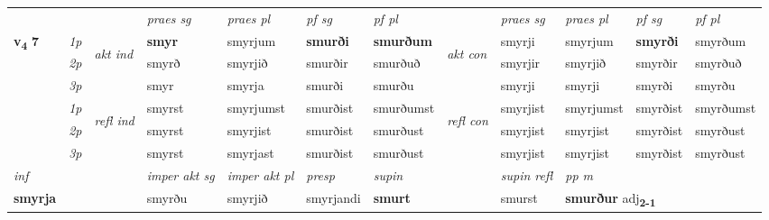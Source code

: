 \begin{longtable}[l]{X>{\footnotesize\itshape}llXXXXlXXXX}
 & &   & \textit{praes sg}  & \textit{praes pl}    & \textit{ pf sg} & \textit{pf pl} & & \textit{praes sg}  & \textit{praes pl}    & \textit{pf sg} & \textit{pf pl }  \\ \cmidrule{4-7} \cmidrule{9-12}
 \multirow{2}{*}{{{\textbf{v{\textsubscript{4}}} \Large{\textbf{7}}}}}  & 1p & \multirow{3}{*}{\begin{turn}{90}\textit{akt ind}\end{turn}} & \textbf{smyr} & smyrjum & \textbf{smurði} & \textbf{smurðum} & \multirow{3}{*}{\begin{turn}{90}\textit{akt con}\end{turn}} &smyrji & smyrjum & \textbf{smyrði} & smyrðum\\*
 & 2p &  &  smyrð  & smyrjið & smurðir & smurðuð & & smyrjir & smyrjið & smyrðir & smyrðuð \\*
 & 3p &  & smyr & smyrja & smurði & smurðu & & smyrji & smyrji& smyrði & smyrðu \\*
\cmidrule{4-7} \cmidrule{9-12}
 & 1p & \multirow{3}{*}{\begin{turn}{90}\textit{refl ind}\end{turn}}  & smyrst & smyrjumst & smurðist & smurðumst & \multirow{3}{*}{\begin{turn}{90}\textit{refl con}\end{turn}}  &smyrjist & smyrjumst & smyrðist & smyrðumst \\*
 & 2p &  & smyrst & smyrjist & smurðist & smurðust & &smyrjist & smyrjist & smyrðist & smyrðust \\*
 & 3p  & & smyrst & smyrjast & smurðist & smurðust & & smyrjist & smyrjist& smyrðist & smyrðust \\*
\cmidrule{4-7} \cmidrule{9-12}

   {\textit{inf}} & &  & \textit{imper akt sg} & \textit{imper akt pl}   & \textit{presp} & \textit{supin} && \textit{supin refl} & \textit{pp m} \\*
  {\textbf{smyrja}} & && smyrðu  & smyrjið   & smyrjandi &  \textbf{smurt} && smurst & \multicolumn{2}{l}{\textbf{smurður} adj\textbf{\textsubscript{2-1}}} \\*

\midrule


\end{longtable}
